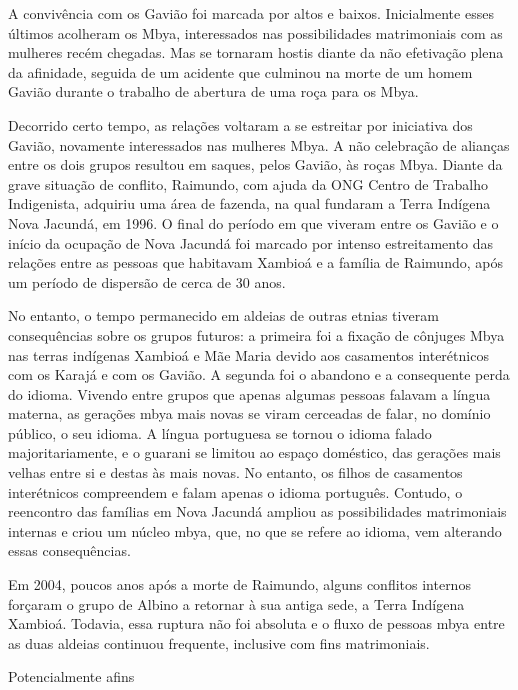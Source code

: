 \documentclass{article}
\begin{document}
A conviv\^encia com os Gavi\~ao foi marcada por altos e baixos.
Inicialmente esses \'ultimos acolheram os Mbya, interessados nas
possibilidades matrimoniais com as mulheres rec\'em chegadas. Mas se
tornaram hostis diante da n\~ao efetiva\c{c}\~ao plena da afinidade,
seguida de um acidente que culminou na morte de um homem Gavi\~ao
durante o trabalho de abertura de uma ro\c{c}a para os Mbya.

Decorrido certo tempo, as rela\c{c}\~oes voltaram a se estreitar por
iniciativa dos Gavi\~ao, novamente interessados nas mulheres Mbya. A
n\~ao celebra\c{c}\~ao de alian\c{c}as entre os dois grupos resultou em
saques, pelos Gavi\~ao, \`as ro\c{c}as Mbya. Diante da grave
situa\c{c}\~ao de conflito, Raimundo, com ajuda da ONG Centro de
Trabalho Indigenista, adquiriu uma \'area de fazenda, na qual fundaram
a Terra Ind\'igena Nova Jacund\'a, em 1996. O final do per\'iodo em que
viveram entre os Gavi\~ao e o in\'icio da ocupa\c{c}\~ao de Nova
Jacund\'a foi marcado por intenso estreitamento das rela\c{c}\~oes
entre as pessoas que habitavam Xambio\'a e a fam\'ilia de Raimundo,
ap\'os um per\'iodo de dispers\~ao de cerca de 30 anos.

No entanto, o tempo permanecido em aldeias de outras etnias tiveram
consequ\^encias sobre os grupos futuros: a primeira foi a fixa\c{c}\~ao
de c\^onjuges Mbya nas terras ind\'igenas Xambio\'a e M\~ae Maria
devido aos casamentos inter\'etnicos com os Karaj\'a e com os Gavi\~ao.
A segunda foi o abandono e a consequente perda do idioma. Vivendo entre
grupos que apenas algumas pessoas falavam a l\'ingua materna, as
gera\c{c}\~oes mbya mais novas se viram cerceadas de falar, no
dom\'inio p\'ublico, o seu idioma. A l\'ingua portuguesa se tornou o
idioma falado majoritariamente, e o guarani se limitou ao espa\c{c}o
dom\'estico, das gera\c{c}\~oes mais velhas entre si e destas \`as mais
novas. No entanto, os filhos de casamentos inter\'etnicos compreendem e
falam apenas o idioma portugu\^es. Contudo, o reencontro das fam\'ilias
em Nova Jacund\'a ampliou as possibilidades matrimoniais internas e
criou um n\'ucleo mbya, que, no que se refere ao idioma, vem alterando
essas consequ\^encias.

Em 2004, poucos anos ap\'os a morte de Raimundo, alguns conflitos
internos for\c{c}aram o grupo de Albino a retornar \`a sua antiga sede,
a Terra Ind\'igena Xambio\'a. Todavia, essa ruptura n\~ao foi absoluta
e o fluxo de pessoas mbya entre as duas aldeias continuou frequente,
inclusive com fins matrimoniais.

Potencialmente afins
\end{document}
